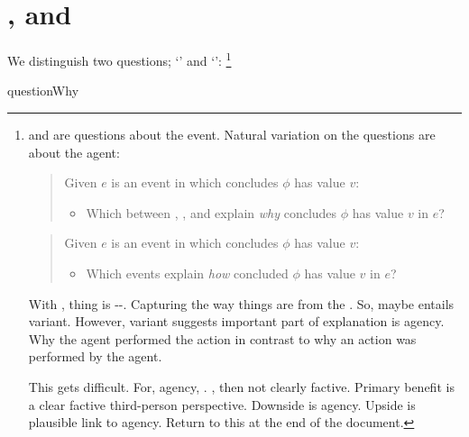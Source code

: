 \section*{\qWhy{}, \qHow{} and \issueInclusion{}}
\label{cha:intro:why-how}

\begin{note}
  We distinguish two questions; `\qWhy{}' and `\qHow{}':%
  \footnote{
    \qWhy{} and \qHow{} are questions about the event.
    Natural variation on the questions are about the agent:

    \begin{quote}
      Given \(e\) is an event in which \vAgent{} concludes \(\phi\) has value \(v\):
    \begin{itemize}
    \item
      Which \ros{} between , , and  explain \emph{why} \vAgent{} concludes \(\phi\) has value \(v\) in \(e\)?
    \end{itemize}
  \end{quote}

  \begin{quote}
    Given \(e\) is an event in which \vAgent{} concludes \(\phi\) has value \(v\):
    \begin{itemize}
    \item
      Which events explain \emph{how} \vAgent{} concluded \(\phi\) has value \(v\) in \(e\)?
    \end{itemize}
  \end{quote}

  With \qWhy{}, thing is --.
  Capturing the way things are from the \agpe{}.
  So, maybe entails variant.
  However, variant suggests important part of explanation is agency.
  Why the agent performed the action in contrast to why an action was performed by the agent.

  This gets difficult.
  For, agency, \agpe{}.
  \agpe{}, then not clearly factive.
  Primary benefit is a clear factive third-person perspective.
  Downside is agency.
  Upside is plausible link to agency.
  Return to this at the end of the document.
  }

  \begin{question}{questionWhy}{\qWhy{}}
    \medskip


\end{question}
\end{note}
